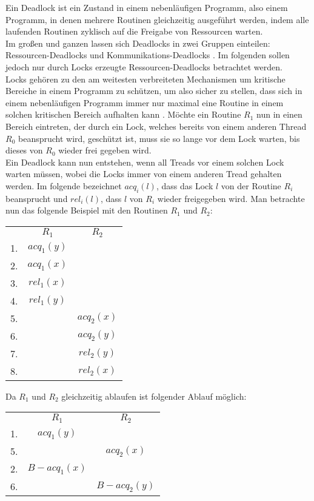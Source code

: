 Ein Deadlock ist ein Zustand in einem nebenläufigen Programm, also einem 
Programm, in denen mehrere Routinen gleichzeitig ausgeführt werden, indem alle 
laufenden Routinen zyklisch auf die Freigabe von Ressourcen warten.\\
Im großen und ganzen lassen sich Deadlocks in zwei Gruppen einteilen: 
Ressourcen-Deadlocks und Kommunikations-Deadlocks \cite{zhou}.
Im folgenden sollen jedoch nur durch Locks erzeugte Ressourcen-Deadlocks 
betrachtet werden.\\
Locks gehören zu den am weitesten verbreiteten Mechanismen um kritische 
Bereiche in einem Programm zu schützen, um also sicher zu stellen,
dass sich in einem nebenläufigen Programm immer nur maximal eine Routine in einem 
solchen kritischen Bereich aufhalten kann \cite{zhou}.
Möchte ein Routine $R_1$ nun in einen Bereich 
eintreten, der durch ein Lock, welches bereits von einem anderen Thread $R_0$ 
beansprucht wird, geschützt ist, muss sie so lange vor dem Lock warten, bis dieses 
von $R_0$ wieder frei gegeben wird.\\
Ein Deadlock kann nun entstehen, wenn all Treads vor einem solchen Lock warten 
müssen, wobei die Locks immer von einem anderen Tread gehalten werden. 
Im folgende bezeichnet $acq_i(l)$, dass das Lock $l$ von der Routine $R_i$ 
beansprucht und $rel_i(l)$, dass $l$ von $R_i$ wieder freigegeben wird. 
Man betrachte nun das folgende Beispiel \cite{sulzmann} mit den Routinen 
$R_1$ und $R_2$:
\begin{table}[H]
    \centering
    \begin{tabular}{ccc}
       & $R_1$        & $R_2$          \\
    1. & $acq_{1}(y)$ &                \\
    2. & $acq_{1}(x)$ &                \\
    3. & $rel_{1}(x)$ &                \\
    4. & $rel_{1}(y)$ &                \\
    5. &              & $acq_{2}(x)$ \\
    6. &              & $acq_{2}(y)$ \\
    7. &              & $rel_{2}(y)$ \\
    8. &              & $rel_{2}(x)$
    \end{tabular}
\end{table}
Da $R_1$ und $R_2$ gleichzeitig ablaufen ist folgender Ablauf möglich:
\begin{table}[H]
    \centering
    \begin{tabular}{ccc}
       & $R_1$          & $R_2$          \\
    1. & $acq_{1}(y)$ &                \\
    5. &                & $acq_{2}(x)$ \\
    2. & $B-acq_{1}(x)$ &                \\
    6. &                & $B-acq_{2}(y)$
    \end{tabular}
\end{table}
